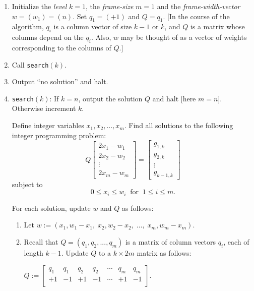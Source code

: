 \documentclass[11pt,a4paper]{article}
\begin{document}
\begin{enumerate}
\item Initialize the \emph{level} $k=1$, 
the \emph{frame-size} $m = 1$ and the
\emph{frame-width-vector} $w=(w_1)=(n)$.  
Set $q_1=(+1)$ and $Q=q_1$.
[In the course of the algorithm, $q_i$ is a column vector of size
$k-1$ or $k$, and $Q$ is a matrix whose columns depend on the $q_i$.
Also, $w$ may be thought of as a vector of weights 
corresponding to the columns of $Q$.]
\item Call {\tt search}$(k)$.
\item Output ``no solution'' and halt.
\item {\tt search}$(k)$:	\label{it2:lin}
If $k=n$, output the solution $Q$ and halt [here $m=n$]. 
Otherwise increment $k$. 

Define integer variables $x_1, x_2, \ldots, x_m$.  
Find all solutions
to the following integer programming problem:
\begin{equation}					\label{eq:lineq}
Q 
\left [
\begin{matrix}
2x_1 - w_1\\2x_2-w_2\\\vdots \\2x_m-w_m
\end{matrix}
\right ]
=
\left [
\begin{matrix}
g_{1,k}\\g_{2,k}\\ \vdots \\ g_{k-1, k}
\end{matrix}
\right ]
\end{equation}
subject to
\begin{equation}
0 \le x_i \le w_i \;\;\text{for}\;\; 1 \le i \le m.	\label{eq:bounds}
\end{equation}

For each solution, update $w$ and $Q$ as follows:

\begin{enumerate}
\item Let $w:= (x_1, w_1-x_1,\; x_2, w_2-x_2,\; \ldots,\; x_m, w_m-x_m)$.
\item Recall that $Q=(q_1, q_2, ..., q_m)$ is a matrix of column vectors $q_i$,
       each of length $k-1$.  Update $Q$ to a $k \times 2m$ matrix as follows:

 $Q:=
\left[
\begin{matrix}
q_1 & q_1& q_2 & q_2 & \cdots & q_m & q_m\\
+1 & -1 & +1 & -1 & \cdots & +1 & -1\\
\end{matrix}
\right].
$


\end{enumerate}
\end{enumerate}
\end{document}
